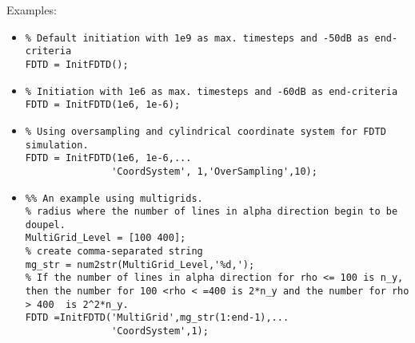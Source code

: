 	\begin{FontDescr}{Examples:}
\begin{itemize}
\item 
\begin{lstlisting}
% Default initiation with 1e9 as max. timesteps and -50dB as end-criteria
FDTD = InitFDTD(); 
\end{lstlisting}

\item 
\begin{lstlisting}
% Initiation with 1e6 as max. timesteps and -60dB as end-criteria
FDTD = InitFDTD(1e6, 1e-6);
\end{lstlisting}

\item 
\begin{lstlisting}
% Using oversampling and cylindrical coordinate system for FDTD simulation.
FDTD = InitFDTD(1e6, 1e-6,...
               'CoordSystem', 1,'OverSampling',10);
\end{lstlisting}

\item 
\begin{lstlisting}
%% An example using multigrids.
% radius where the number of lines in alpha direction begin to be doupel.
MultiGrid_Level = [100 400];
% create comma-separated string
mg_str = num2str(MultiGrid_Level,'%d,');
% If the number of lines in alpha direction for rho <= 100 is n_y, then the number for 100 <rho < =400 is 2*n_y and the number for rho > 400  is 2^2*n_y.
FDTD =InitFDTD('MultiGrid',mg_str(1:end-1),...
               'CoordSystem',1);
\end{lstlisting}
\end{itemize}	 
	\end{FontDescr}



